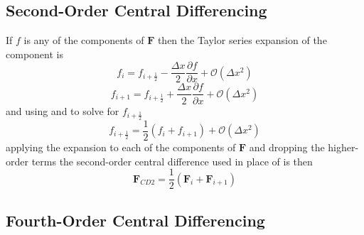 \subsection{Second-Order Central Differencing}\label{sect:SecondOrderCD}
If $f$ is any of the components of $\boldsymbol{F}$ then the Taylor series expansion of the component is
\begin{equation}\label{eqn:fiexpansionCD2}
	f_{i} = f_{i+\frac{1}{2}} - \frac{\Delta x}{2} \frac{\partial f}{\partial x} + \mathcal{O}\left(\Delta x^2\right)
\end{equation}
\begin{equation}\label{eqn:fip1expansionCD2}
	f_{i+1} = f_{i+\frac{1}{2}} + \frac{\Delta x}{2} \frac{\partial f}{\partial x} + \mathcal{O}\left(\Delta x^2\right)
\end{equation}
and using  and  to solve for $f_{i+\frac{1}{2}}$
\begin{equation}
	f_{i+\frac{1}{2}} = \frac{1}{2} \left(f_{i} + f_{i+1}\right) + \mathcal{O}\left(\Delta x^2\right)
\end{equation}
applying the expansion to each of the components of $\boldsymbol{F}$ and dropping the higher-order terms the second-order central difference used in place of  is then
\begin{equation}\label{eqn:CD2}
	\boldsymbol{F}_{CD2} = \frac{1}{2} \left(\boldsymbol{F}_i + \boldsymbol{F}_{i+1}\right)
\end{equation}
\subsection{Fourth-Order Central Differencing}

